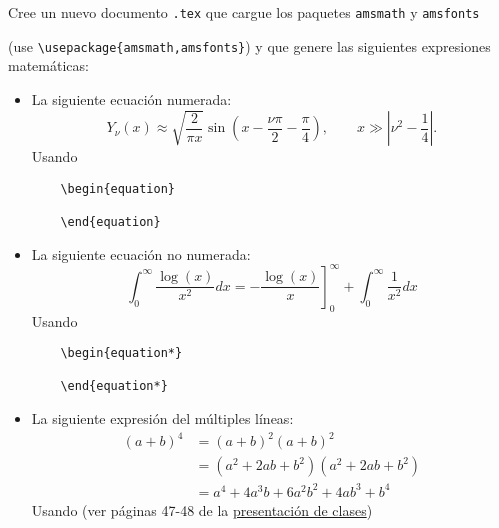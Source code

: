 \documentclass[11pt]{exam}
\begin{document}
\begin{questions}

\item Cree un nuevo documento \texttt{.tex} que cargue los paquetes \texttt{amsmath} y \texttt{amsfonts} 

(use \verb|\usepackage{amsmath,amsfonts}|) y que genere las siguientes expresiones matemáticas:
\begin{itemize}

\item La siguiente ecuación numerada:
\begin{equation}\label{asinNnu}
Y_\nu(x)\approx \sqrt{\frac{2}{\pi x}}\sin\left(x-\frac{\nu\pi}{2}-\frac{\pi}{4}\right), 
\qquad x\gg\left|\nu^2-\frac{1}{4}\right|.
\end{equation}
Usando 

\begin{verbatim}
	\begin{equation}

	\end{equation}
\end{verbatim}
\item La siguiente ecuación no numerada:
\begin{equation*}
\int_{0}^{\infty }\frac{\log (x)}{x^{2}}dx=-\left. \frac{\log (x)}{x}\right]
_{0}^{\infty }+\int_{0}^{\infty }\frac{1}{x^{2}}dx
\end{equation*}
Usando

\begin{verbatim}
	\begin{equation*}

	\end{equation*}
\end{verbatim}
\item La siguiente expresión del múltiples líneas:
\begin{align} 
(a+b)^4 &= (a+b)^2 (a+b)^2 \\
 &= (a^2+2ab+b^2) (a^2+2ab+b^2) \\
 &= a^4+4 a^3 b + 6 a^2 b^2 +4 a b^3 +b^4
\end{align}
Usando (ver páginas 47-48 de la \href{https://udec.instructure.com/courses/40179/pages/latex-pdf-presentacion?module_item_id=1465499}{presentación de clases})


\end{itemize}
\end{questions}
\end{document}
